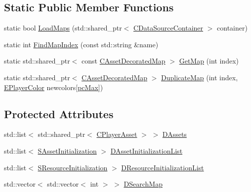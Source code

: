\subsection*{Static Public Member Functions}
\begin{DoxyCompactItemize}
\item 
static bool \hyperlink{classCAssetDecoratedMap_a03b043bddf72e2d97171b704f538f4d0}{Load\+Maps} (std\+::shared\+\_\+ptr$<$ \hyperlink{classCDataSourceContainer}{C\+Data\+Source\+Container} $>$ container)
\item 
static int \hyperlink{classCAssetDecoratedMap_a4029b81572e80d897eb4e165c6e925be}{Find\+Map\+Index} (const std\+::string \&name)
\item 
static std\+::shared\+\_\+ptr$<$ const \hyperlink{classCAssetDecoratedMap}{C\+Asset\+Decorated\+Map} $>$ \hyperlink{classCAssetDecoratedMap_afafb067884070fe0340f8b7e63bdc099}{Get\+Map} (int index)
\item 
static std\+::shared\+\_\+ptr$<$ \hyperlink{classCAssetDecoratedMap}{C\+Asset\+Decorated\+Map} $>$ \hyperlink{classCAssetDecoratedMap_a9d0fa2b32e4e8add6da83a7ebcfab6d8}{Duplicate\+Map} (int index, \hyperlink{GameDataTypes_8h_aafb0ca75933357ff28a6d7efbdd7602f}{E\+Player\+Color} newcolors\mbox{[}\hyperlink{GameDataTypes_8h_aafb0ca75933357ff28a6d7efbdd7602fa594a5c8dd3987f24e8a0f23f1a72cd34}{pc\+Max}\mbox{]})
\end{DoxyCompactItemize}
\subsection*{Protected Attributes}
\begin{DoxyCompactItemize}
\item 
std\+::list$<$ std\+::shared\+\_\+ptr$<$ \hyperlink{classCPlayerAsset}{C\+Player\+Asset} $>$ $>$ \hyperlink{classCAssetDecoratedMap_a94eeed5b16141169b1ba6cb3842055aa}{D\+Assets}
\item 
std\+::list$<$ \hyperlink{structCAssetDecoratedMap_1_1SAssetInitialization}{S\+Asset\+Initialization} $>$ \hyperlink{classCAssetDecoratedMap_a2b7bf2e9a19a9173093cef32048608c2}{D\+Asset\+Initialization\+List}
\item 
std\+::list$<$ \hyperlink{structCAssetDecoratedMap_1_1SResourceInitialization}{S\+Resource\+Initialization} $>$ \hyperlink{classCAssetDecoratedMap_ab4c78aeb90280ea98a3aa542cdb7f8cc}{D\+Resource\+Initialization\+List}
\item 
std\+::vector$<$ std\+::vector$<$ int $>$ $>$ \hyperlink{classCAssetDecoratedMap_a7e6c8b62a9f83cec4bc77dc833d5787a}{D\+Search\+Map}
\end{DoxyCompactItemize}

